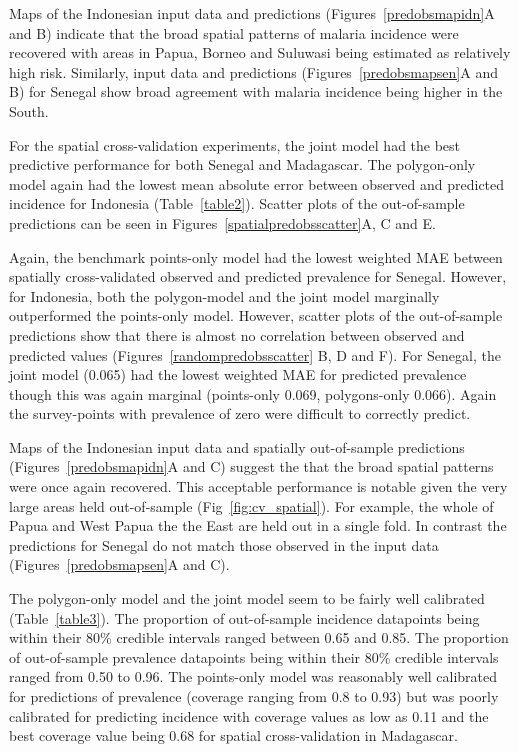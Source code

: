 \documentclass[10pt,letterpaper]{article}
\begin{document}
Maps of the Indonesian input data and predictions (Figures~\ref{predobsmapidn}A and B) indicate that the broad spatial patterns of malaria incidence were recovered with areas in Papua, Borneo and Suluwasi being estimated as relatively high risk.
Similarly, input data and predictions (Figures~\ref{predobsmapsen}A and B) for Senegal show broad agreement with malaria incidence being higher in the South.




For the spatial cross-validation experiments, the joint model had the best predictive performance for both Senegal and Madagascar.
The polygon-only model again had the lowest mean absolute error between observed and predicted incidence for Indonesia (Table~\ref{table2}).
Scatter plots of the out-of-sample predictions can be seen in Figures~\ref{spatialpredobsscatter}A, C and E.

Again, the benchmark points-only model had the lowest weighted MAE between spatially cross-validated observed and predicted prevalence for Senegal.
However, for Indonesia, both the polygon-model and the joint model marginally outperformed the points-only model. 
However, scatter plots of the out-of-sample predictions show that there is almost no correlation between observed and predicted values (Figures~\ref{randompredobsscatter} B, D and F).
For Senegal, the joint model (0.065) had the lowest weighted MAE for predicted prevalence though this was again marginal (points-only 0.069, polygons-only 0.066).
Again the survey-points with prevalence of zero were difficult to correctly predict.

Maps of the Indonesian input data and spatially out-of-sample predictions (Figures~\ref{predobsmapidn}A and C) suggest the that the broad spatial patterns were once again recovered.
This acceptable performance is notable given the very large areas held out-of-sample (Fig~\ref{fig:cv_spatial}).
For example, the whole of Papua and West Papua the the East are held out in a single fold.
In contrast the predictions for Senegal do not match those observed in the input data (Figures~\ref{predobsmapsen}A and C). 



The polygon-only model and the joint model seem to be fairly well calibrated (Table~\ref{table3}).
The proportion of out-of-sample incidence datapoints being within their 80\% credible intervals ranged between 0.65 and 0.85.
The proportion of out-of-sample prevalence datapoints being within their 80\% credible intervals ranged from 0.50 to 0.96.
The points-only model was reasonably well calibrated for predictions of prevalence (coverage ranging from 0.8 to 0.93) but was poorly calibrated for predicting incidence with coverage values as low as 0.11 and the best coverage value being 0.68 for spatial cross-validation in Madagascar.
\end{document}
